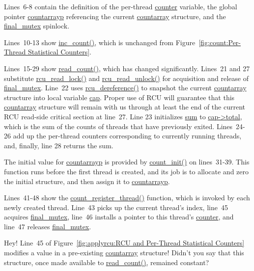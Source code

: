 Lines~6-8 contain the definition of the per-thread \url{counter}
variable, the global pointer \url{countarrayp} referencing
the current \url{countarray} structure, and
the \url{final_mutex} spinlock.

Lines~10-13 show \url{inc_count()}, which is unchanged from
Figure~\ref{fig:count:Per-Thread Statistical Counters}.

Lines~15-29 show \url{read_count()}, which has changed significantly.
Lines~21 and 27 substitute \url{rcu_read_lock()} and
\url{rcu_read_unlock()} for acquisition and release of \url{final_mutex}.
Line~22 uses \url{rcu_dereference()} to snapshot the
current \url{countarray} structure into local variable \url{cap}.
Proper use of RCU will guarantee that this \url{countarray} structure
will remain with us through at least the end of the current RCU
read-side critical section at line~27.
Line 23 initializes \url{sum} to \url{cap->total}, which is the
sum of the counts of threads that have previously exited.
Lines~24-26 add up the per-thread counters corresponding to currently
running threads, and, finally, line 28 returns the sum.

The initial value for \url{countarrayp} is
provided by \url{count_init()} on lines~31-39.
This function runs before the first thread is created, and its job
is to allocate
and zero the initial structure, and then assign it to \url{countarrayp}.

Lines~41-48 show the \url{count_register_thread()} function, which
is invoked by each newly created thread.
Line~43 picks up the current thread's index, line~45 acquires
\url{final_mutex}, line~46 installs a pointer to this thread's
\url{counter}, and line~47 releases \url{final_mutex}.

\QuickQuiz{}
	Hey!
	Line~45 of
	Figure~\ref{fig:applyrcu:RCU and Per-Thread Statistical Counters}
	modifies a value in a pre-existing \url{countarray} structure!
	Didn't you say that this structure, once made available to
	\url{read_count()}, remained constant?
 \QuickQuizEnd

